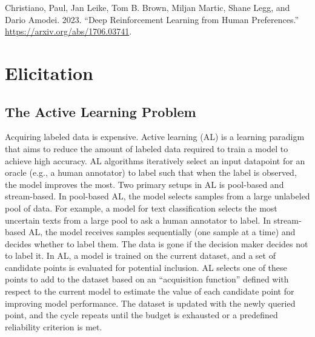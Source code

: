 \documentclass[
  letterpaper,
  numbers=noenddot,
  DIV=11]{scrreprt}
\newlength{\cslhangindent}
\newenvironment{CSLReferences}[2] %
 {\begin{list}{}{%
  \setlength{\itemindent}{0pt}
  \setlength{\leftmargin}{0pt}
  \setlength{\parsep}{0pt}
  \ifodd #1
   \setlength{\leftmargin}{\cslhangindent}
   \setlength{\itemindent}{-1\cslhangindent}
  \fi
  \setlength{\itemsep}{#2\baselineskip}}}
 {\end{list}}
\let\oldchapter\chapter
\def\chapter{%
  \setcounter{sidenote}{1}%
  \oldchapter
}
\theoremstyle{plain}
\theoremstyle{definition}
\theoremstyle{remark}
\begin{document}

\label{refs-3}
\begin{CSLReferences}{1}{0}
Christiano, Paul, Jan Leike, Tom B. Brown, Miljan Martic, Shane Legg,
and Dario Amodei. 2023. {``Deep Reinforcement Learning from Human
Preferences.''} \url{https://arxiv.org/abs/1706.03741}.

\end{CSLReferences}


\chapter{Elicitation}\label{elicitation}

\section{The Active Learning Problem}\label{the-active-learning-problem}

Acquiring labeled data is expensive. Active learning (AL) is a learning
paradigm that aims to reduce the amount of labeled data required to
train a model to achieve high accuracy. AL algorithms iteratively select
an input datapoint for an oracle (e.g., a human annotator) to label such
that when the label is observed, the model improves the most. Two
primary setups in AL is pool-based and stream-based. In pool-based AL,
the model selects samples from a large unlabeled pool of data. For
example, a model for text classification selects the most uncertain
texts from a large pool to ask a human annotator to label. In
stream-based AL, the model receives samples sequentially (one sample at
a time) and decides whether to label them. The data is gone if the
decision maker decides not to label it. In AL, a model is trained on the
current dataset, and a set of candidate points is evaluated for
potential inclusion. AL selects one of these points to add to the
dataset based on an ``acquisition function'' defined with respect to the
current model to estimate the value of each candidate point for
improving model performance. The dataset is updated with the newly
queried point, and the cycle repeats until the budget is exhausted or a
predefined reliability criterion is met.
\end{document}
